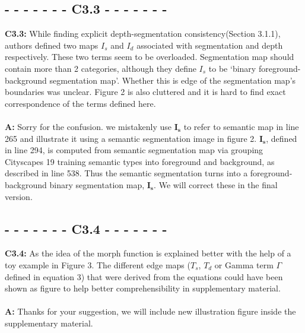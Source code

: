 \documentclass[10pt,twocolumn,letterpaper]{article}
\begin{document}
\subsection*{- - - - - - - C3.3 - - - - - - -}
\noindent \textbf{C3.3:} While finding explicit depth-segmentation consistency(Section 3.1.1), authors defined two maps $I_s$ and $I_d$ associated with segmentation and depth respectively. These two terms seem to be overloaded. Segmentation map should contain more than 2 categories, although they define $I_s$ to be ‘binary foreground-background segmentation map’. Whether this is edge of the segmentation map’s boundaries was unclear. Figure 2 is also cluttered and it is hard to find exact correspondence of the terms defined here. \\ \\
\noindent \textbf{A:} Sorry for the confusion. we mistakenly use $\mathbf{I_s}$ to refer to semantic map in line 265 and illustrate it using a semantic segmentation image in figure 2. $\mathbf{I_s}$, defined in line 294, is computed from semantic segmentation map via grouping Cityscapes 19 training semantic types into foreground and background, as described in line 538. Thus the semantic segmentation turns into a foreground-background binary segmentation map,  $\mathbf{I_s}$. We will correct these in the final version.

\subsection*{- - - - - - - C3.4 - - - - - - -}
\noindent \textbf{C3.4:} As the idea of the morph function is explained better with the help of a toy example in Figure 3. The different edge maps ($T_s$, $T_d$ or Gamma term $\Gamma$ defined in equation 3) that were derived from the equations could have been shown as figure to help better comprehensibility in supplementary material. \\ \\
\noindent \textbf{A:} Thanks for your suggestion, we will include new illustration figure inside the supplementary material.
\end{document}
